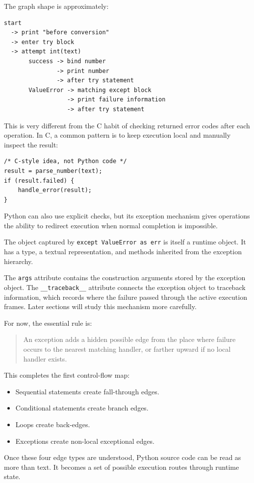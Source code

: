 The graph shape is approximately:

\begin{verbatim}
start
  -> print "before conversion"
  -> enter try block
  -> attempt int(text)
       success -> bind number
               -> print number
               -> after try statement
       ValueError -> matching except block
                  -> print failure information
                  -> after try statement
\end{verbatim}

This is very different from the C habit of checking returned error codes after each operation. In C, a common pattern is to keep execution local and manually inspect the result:

\begin{verbatim}
/* C-style idea, not Python code */
result = parse_number(text);
if (result.failed) {
    handle_error(result);
}
\end{verbatim}

Python can also use explicit checks, but its exception mechanism gives operations the ability to redirect execution when normal completion is impossible.

The object captured by \texttt{except ValueError as err} is itself a runtime object. It has a type, a textual representation, and methods inherited from the exception hierarchy.

The \texttt{args} attribute contains the construction arguments stored by the exception object. The \texttt{\_\_traceback\_\_} attribute connects the exception object to traceback information, which records where the failure passed through the active execution frames. Later sections will study this mechanism more carefully.

For now, the essential rule is:

\begin{quote}
An exception adds a hidden possible edge from the place where failure occurs to the nearest matching handler, or farther upward if no local handler exists.
\end{quote}

This completes the first control-flow map:

\begin{itemize}
    \item Sequential statements create fall-through edges.
    \item Conditional statements create branch edges.
    \item Loops create back-edges.
    \item Exceptions create non-local exceptional edges.
\end{itemize}

Once these four edge types are understood, Python source code can be read as more than text. It becomes a set of possible execution routes through runtime state.